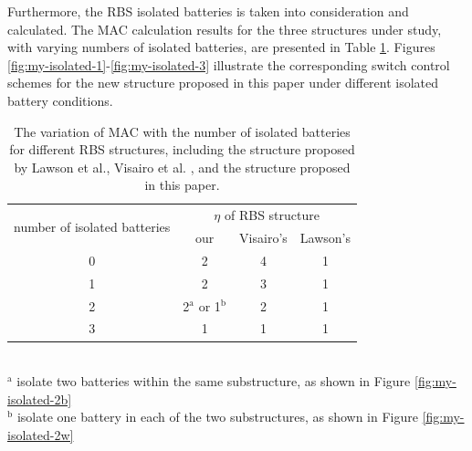\documentclass{article}
\begin{document}
Furthermore, the RBS  isolated batteries is taken into consideration and calculated. 
The MAC calculation results for the three structures under study, with varying numbers of isolated batteries, are presented in Table \ref{tab:isolated_mac}. 
Figures \ref{fig:my-isolated-1}-\ref{fig:my-isolated-3} illustrate the corresponding switch control schemes for the new structure proposed in this paper under different isolated battery conditions.

\begin{table}[htbp]
    \centering
    \caption{
      The variation of MAC with the number of isolated batteries for different RBS structures, including the structure proposed by Lawson et al., Visairo et al. , and the structure proposed in this paper.
      }
      \label{tab:isolated_mac}
      \begin{tabular}{cccc}
      \toprule
      \multirow{2}[4]{*}{number of isolated batteries} & \multicolumn{3}{c}{$\eta$ of RBS structure} \\
  \cmidrule{2-4}          & our  & Visairo's  & Lawson's  \\
      \midrule
      0     & 2     & 4     & 1 \\
      1     & 2     & 3     & 1 \\
      2     & 2$^{\mathrm{a}}$ or 1$^{\mathrm{b}}$ & 2     & 1 \\
      3     & 1     & 1     & 1 \\
      \bottomrule
      \end{tabular}
      \\
      \footnotesize{$^{\mathrm{a}}$ isolate two batteries within the same substructure, as shown in Figure \ref{fig:my-isolated-2b}}\\
      \footnotesize{$^{\mathrm{b}}$ isolate one battery in each of the two substructures, as shown in Figure \ref{fig:my-isolated-2w}}
  \end{table}
  
\end{document}
